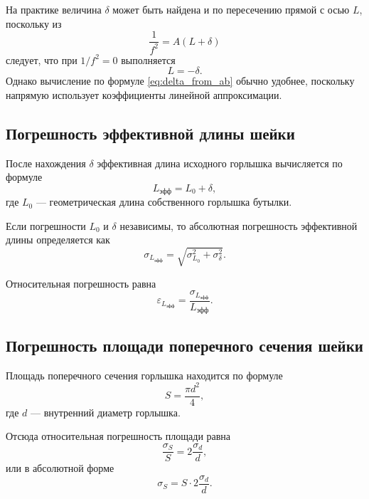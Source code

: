 \documentclass[a4paper,12pt]{article}
\begin{document}
	На практике величина \(\delta\) может быть найдена и по пересечению прямой с осью \(L\), поскольку из
	\[
	\frac{1}{f^2}=A(L+\delta)
	\]
	следует, что при \(1/f^2=0\) выполняется
	\[
	L=-\delta.
	\]
	Однако вычисление по формуле \eqref{eq:delta_from_ab} обычно удобнее, поскольку напрямую использует коэффициенты линейной аппроксимации.
	
	\subsection{Погрешность эффективной длины шейки}
	
	После нахождения \(\delta\) эффективная длина исходного горлышка вычисляется по формуле
	\begin{equation}
		L_{\text{эфф}}=L_0+\delta,
	\end{equation}
	где \(L_0\) --- геометрическая длина собственного горлышка бутылки.
	
	Если погрешности \(L_0\) и \(\delta\) независимы, то абсолютная погрешность эффективной длины определяется как
	\begin{equation}
		\sigma_{L_{\text{эфф}}}
		=
		\sqrt{
			\sigma_{L_0}^2+\sigma_\delta^2
		}.
		\label{eq:sigma_Leff}
	\end{equation}
	
	Относительная погрешность равна
	\begin{equation}
		\varepsilon_{L_{\text{эфф}}}
		=
		\frac{\sigma_{L_{\text{эфф}}}}{L_{\text{эфф}}}.
	\end{equation}
	
	
	
	\subsection{Погрешность площади поперечного сечения шейки}
	
	Площадь поперечного сечения горлышка находится по формуле
	\begin{equation}
		S=\frac{\pi d^2}{4},
	\end{equation}
	где \(d\) --- внутренний диаметр горлышка.
	
	Отсюда относительная погрешность площади равна
	\begin{equation}
		\frac{\sigma_S}{S}=2\frac{\sigma_d}{d},
		\label{eq:sigmaS}
	\end{equation}
	или в абсолютной форме
	\begin{equation}
		\sigma_S=S\cdot 2\frac{\sigma_d}{d}.
	\end{equation}
\end{document}
